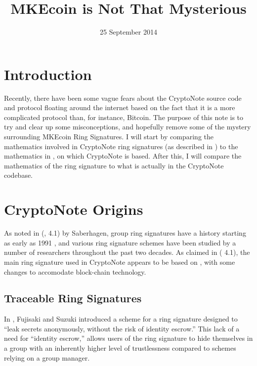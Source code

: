 \documentclass[12pt,english]{mrl}
\numberwithin{equation}{section}
\numberwithin{figure}{section}
\begin{document}
\begin{frontmatter}

\begin{fmbox}
\hfill\setlength{\fboxrule}{0px}\setlength{\fboxsep}{5px}
\title{MKEcoin is Not That Mysterious}
\date{25 September 2014}
\author[
   addressref={mrl},
   email={lab@MKEcoin.cc}
]{ }


\address[id=mrl]{
}
\end{fmbox}



\end{frontmatter}

\section{Introduction}
Recently, there have been some vague fears about the CryptoNote
source code and protocol floating around the internet based on the
fact that it is a more complicated protocol than, for instance, Bitcoin.
The purpose of this note is to try and clear up some misconceptions,
and hopefully remove some of the mystery surrounding MKEcoin Ring Signatures.
I will start by comparing the mathematics involved in CryptoNote
ring signatures (as described in \cite{CN}) to the mathematics in
\cite{FS}, on which CryptoNote is based. After this, I will compare
the mathematics of the ring signature to what is actually in the
CryptoNote codebase. 


\section{CryptoNote Origins}

As noted in (\cite{CN}, 4.1) by Saberhagen, group ring signatures have a history
starting as early as 1991 \cite{CH}, and various ring signature
schemes have been studied by a number of researchers throughout the
past two decades. As claimed in (\cite{CN} 4.1), the main ring signature
used in CryptoNote appears to be based on \cite{FS}, with some changes
to accomodate block-chain technology. 


\subsection{Traceable Ring Signatures}

In \cite{FS}, Fujisaki and Suzuki introduced a scheme for a ring
signature designed to ``leak secrets anonymously, without the risk
of identity escrow.'' This lack of a need for ``identity escrow,''
allows users of the ring signature to hide themselves in a group with
an inherently higher level of trustlessness compared to schemes relying
on a group manager.
\end{document}
